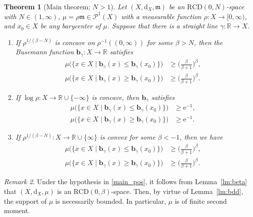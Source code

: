 \documentclass[sts]{imsart}
\newtheorem{theorem}{Theorem}[section]
\theoremstyle{definition}
\theoremstyle{remark}
\newtheorem{remark}[theorem]{Remark}
\newcommand{\R}{\mathbb{R}}
\newcommand{\bb}{\mathbf{b}}
\newcommand{\fm}{\mathfrak{m}}
\newcommand{\dist}{\mathrm{d}}
\newcommand{\lra}{\longrightarrow}
\newcommand{\e}{\mathrm{e}}
\newcommand{\RCD}{\mathrm{RCD}}
\begin{document}
\begin{theorem}[Main theorem; $N>1$]\label{thm:main}
Let $(X,\dist_X,\fm)$ be an $\RCD(0,N)$-space with $N \in (1,\infty)$, $\mu=\rho\fm \in \mathcal{P}^1(X)$ with a measurable function $\rho\colon X \lra [0,\infty)$, and $x_0 \in X$ be any barycenter of $\mu$.
Suppose that there is a straight line $\gamma\colon \R \lra X$.

\begin{enumerate}[{\rm (i)}]
\item\label{main_pos}
If $\rho^{1/(\beta-N)}$ is concave on $\rho^{-1}((0,\infty))$ for some $\beta>N$, then the Busemann function $\bb_{\gamma}\colon X \lra \R$ satisfies
\begin{align}
\mu \bigl( \{ x \in X \mid \bb_{\gamma}(x) \le \bb_{\gamma}(x_0) \} \bigr)
&\ge \biggl( \frac{\beta}{\beta +1} \biggr)^\beta, 
\label{eq:main}\\
\mu \bigl( \{ x \in X \mid \bb_{\gamma}(x) \ge \bb_{\gamma}(x_0) \} \bigr)
&\ge \biggl( \frac{\beta}{\beta +1} \biggr)^\beta.
\nonumber
\end{align}

\item\label{main_inf}
If $\log\rho\colon X \lra \R \cup \{-\infty\}$ is concave, then $\bb_\gamma$ satisfies
\begin{align*}
\mu \bigl( \{ x \in X \mid \bb_{\gamma}(x) \le \bb_{\gamma}(x_0) \} \bigr) &\ge \e^{-1}, \\
\mu \bigl( \{ x \in X \mid \bb_{\gamma}(x) \ge \bb_{\gamma}(x_0) \} \bigr) &\ge \e^{-1}.
\end{align*}

\item\label{main_neg}
If $\rho^{1/(\beta -N)}\colon X \lra \R \cup \{\infty\}$ is convex for some $\beta<-1$, then we have
\begin{align*}
\mu \bigl( \{ x \in X \mid \bb_{\gamma}(x) \le \bb_{\gamma}(x_0) \} \bigr)
&\ge \biggl( \frac{\beta}{\beta +1} \biggr)^\beta, \\
\mu \bigl( \{ x \in X \mid \bb_{\gamma}(x) \ge \bb_{\gamma}(x_0) \} \bigr)
&\ge \biggl( \frac{\beta}{\beta +1} \biggr)^\beta.
\end{align*}
\end{enumerate}
\end{theorem}

\begin{remark}\label{rm:main}
Under the hypothesis in \eqref{main_pos}, it follows from Lemma~\ref{lm:beta} that $(X,\dist_X,\mu)$ is an $\RCD(0,\beta)$-space.
Then, by virtue of Lemma~\ref{lm:bdd}, the support of $\mu$ is necessarily bounded.
In particular, $\mu$ is of finite second moment.
\end{remark}
\end{document}
